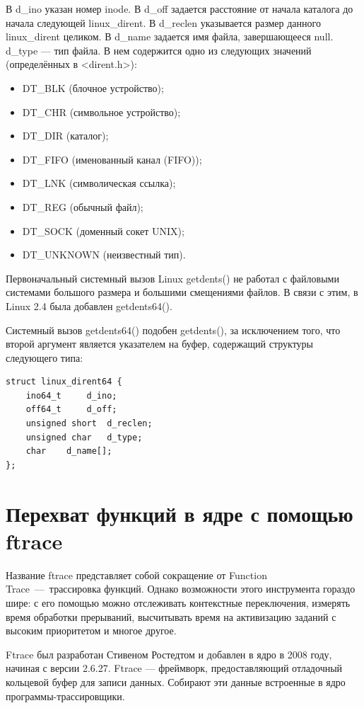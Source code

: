 В d\_ino указан номер inode. В d\_off задается расстояние от начала каталога до начала следующей linux\_dirent. В d\_reclen указывается размер данного linux\_dirent целиком. В d\_name задается имя файла, завершающееся null.
d\_type --- тип файла.
В нем содержится одно из следующих значений (определённых в <dirent.h>):
\begin{itemize}
	\item DT\_BLK (блочное устройство);
	\item DT\_CHR (символьное устройство);
	\item DT\_DIR (каталог);
	\item DT\_FIFO (именованный канал (FIFO));
	\item DT\_LNK (символическая ссылка);
	\item DT\_REG (обычный файл);
	\item DT\_SOCK (доменный сокет UNIX);
	\item DT\_UNKNOWN (неизвестный тип).
\end{itemize}


Первоначальный системный вызов Linux getdents() не работал с файловыми системами большого размера и большими смещениями файлов. В связи с этим, в Linux 2.4 была добавлен getdents64().

Системный вызов getdents64() подобен getdents(), за исключением того, что второй аргумент является указателем на буфер, содержащий структуры следующего типа:

\begin{lstlisting}[label=code:linuxdirent64,caption=Структура linux\_dirent64]
struct linux_dirent64 {
	ino64_t		d_ino;
	off64_t		d_off;    
	unsigned short	d_reclen; 
	unsigned char	d_type;  
	char	d_name[]; 
};
\end{lstlisting}


\section{Перехват функций в ядре с помощью ftrace}

Название ftrace представляет собой сокращение от Function Trace~---~трассировка функций. Однако возможности этого инструмента гораздо шире: с его помощью можно отслеживать контекстные переключения, измерять время обработки прерываний, высчитывать время на активизацию заданий с высоким приоритетом и многое другое.

Ftrace был разработан Стивеном Ростедтом и добавлен в ядро в 2008 году, начиная с версии 2.6.27. Ftrace --- фреймворк, предоставляющий отладочный кольцевой буфер для записи данных. Собирают эти данные встроенные в ядро программы-трассировщики.

